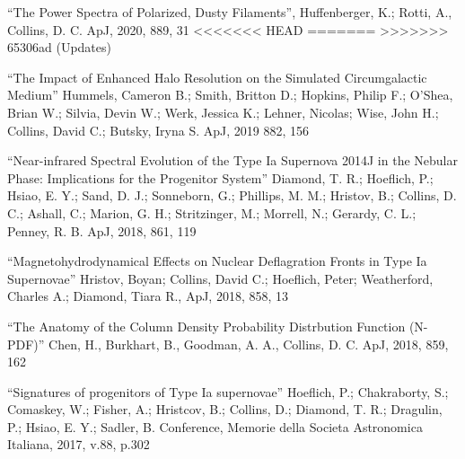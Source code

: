 \medskip
\noindent
``The Power Spectra of Polarized, Dusty Filaments'', Huffenberger, K.; Rotti,
A., Collins, D. C. ApJ, 2020, 889, 31
<<<<<<< HEAD
=======
>>>>>>> 65306ad (Updates)

\medskip
\noindent
``The Impact of Enhanced Halo Resolution on the Simulated Circumgalactic Medium''
Hummels, Cameron B.; Smith, Britton D.; Hopkins, Philip F.; O'Shea, Brian W.; Silvia, Devin W.; 
Werk, Jessica K.; Lehner, Nicolas; Wise, John H.; Collins, David C.; Butsky, Iryna S.   
ApJ, 2019 882, 156

\medskip
\noindent
``Near-infrared Spectral Evolution of the Type Ia Supernova 2014J in the Nebular
Phase: Implications for the Progenitor System''
Diamond, T. R.; Hoeflich, P.; Hsiao, E. Y.; Sand, D. J.; Sonneborn, G.;
Phillips, M. M.; Hristov, B.; Collins, D. C.; Ashall, C.; Marion, G. H.;
Stritzinger, M.; Morrell, N.; Gerardy, C. L.; Penney, R. B.
ApJ, 2018, 861, 119

\medskip
\noindent
``Magnetohydrodynamical Effects on Nuclear Deflagration Fronts in Type Ia Supernovae''
Hristov, Boyan; Collins, David C.; Hoeflich, Peter; Weatherford, Charles A.; Diamond, Tiara R., 
ApJ, 2018, 858, 13


\medskip
\noindent
``The Anatomy of the Column Density Probability Distrbution Function (N-PDF)''
Chen, H., Burkhart, B., Goodman, A. A., Collins, D. C. 
ApJ, 2018, 859, 162

\medskip
\noindent
``Signatures of progenitors of Type Ia supernovae''
Hoeflich, P.; Chakraborty, S.; Comaskey, W.; Fisher, A.; Hristcov, B.; Collins, D.; Diamond, T. R.; Dragulin, P.; Hsiao, E. Y.; Sadler, B.
Conference, Memorie della Societa Astronomica Italiana, 2017, v.88, p.302

